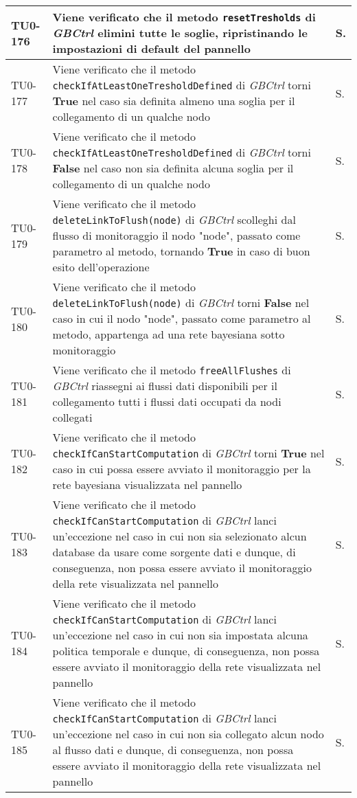 \begin{longtable}{|C{.15\textwidth}|m{.66\textwidth}|C{.10\textwidth}|}
\hline
TU0-176 & Viene verificato che il metodo \texttt{resetTresholds} di \textit{GBCtrl} elimini tutte le soglie, ripristinando le impostazioni di default del pannello & S.\\
\hline
{}TU0-177 & Viene verificato che il metodo \texttt{checkIfAtLeastOneTresholdDefined} di \textit{GBCtrl} torni \textbf{True} nel caso sia definita almeno una soglia per il collegamento di un qualche nodo & S.\\
\hline
TU0-178 & Viene verificato che il metodo \texttt{checkIfAtLeastOneTresholdDefined} di \textit{GBCtrl} torni \textbf{False} nel caso non sia definita alcuna soglia per il collegamento di un qualche nodo & S.\\
\hline
{}TU0-179 & Viene verificato che il metodo \texttt{deleteLinkToFlush(node)} di \textit{GBCtrl} scolleghi dal flusso di monitoraggio il nodo "node", passato come parametro al metodo, tornando \textbf{True} in caso di buon esito dell'operazione & S.\\
\hline
TU0-180 & Viene verificato che il metodo \texttt{deleteLinkToFlush(node)} di \textit{GBCtrl} torni \textbf{False} nel caso in cui il nodo "node", passato come parametro al metodo, appartenga ad una rete bayesiana sotto monitoraggio & S.\\
\hline
{}TU0-181 & Viene verificato che il metodo \texttt{freeAllFlushes} di \textit{GBCtrl} riassegni ai flussi dati disponibili per il collegamento tutti i flussi dati occupati da nodi collegati & S.\\
\hline
TU0-182 & Viene verificato che il metodo \texttt{checkIfCanStartComputation} di \textit{GBCtrl} torni \textbf{True} nel caso in cui possa essere avviato il monitoraggio per la rete bayesiana visualizzata nel pannello & S.\\
\hline
{}TU0-183 & Viene verificato che il metodo \texttt{checkIfCanStartComputation} di \textit{GBCtrl} lanci un'eccezione nel caso in cui non sia selezionato alcun database da usare come sorgente dati e dunque, di conseguenza, non possa essere avviato il monitoraggio della rete visualizzata nel pannello & S.\\
\hline
TU0-184 & Viene verificato che il metodo \texttt{checkIfCanStartComputation} di \textit{GBCtrl} lanci un'eccezione nel caso in cui non sia impostata alcuna politica temporale e dunque, di conseguenza, non possa essere avviato il monitoraggio della rete visualizzata nel pannello & S.\\
\hline
{}TU0-185 & Viene verificato che il metodo \texttt{checkIfCanStartComputation} di \textit{GBCtrl} lanci un'eccezione nel caso in cui non sia collegato alcun nodo al flusso dati e dunque, di conseguenza, non possa essere avviato il monitoraggio della rete visualizzata nel pannello & S.\\

\end{longtable}
